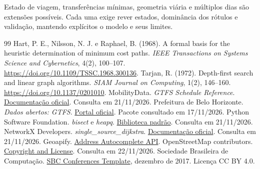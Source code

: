 \documentclass[12pt]{article}
\begin{document}
Estado de viagem, transferências mínimas, geometria viária e múltiplos dias são extensões possíveis. Cada uma exige rever estados, dominância dos rótulos e validação, mantendo explícitos o modelo e seus limites.

\small
\begin{thebibliography}{99}
\setlength{\itemsep}{0pt}
 Hart, P. E., Nilsson, N. J. e Raphael, B. (1968). A formal basis for the heuristic determination of minimum cost paths. \emph{IEEE Transactions on Systems Science and Cybernetics}, 4(2), 100--107. \url{https://doi.org/10.1109/TSSC.1968.300136}.
 Tarjan, R. (1972). Depth-first search and linear graph algorithms. \emph{SIAM Journal on Computing}, 1(2), 146--160. \url{https://doi.org/10.1137/0201010}.
 MobilityData. \emph{GTFS Schedule Reference}. \href{https://gtfs.org/documentation/schedule/reference/}{Documentação oficial}. Consulta em 21/11/2026.
 Prefeitura de Belo Horizonte. \emph{Dados abertos: GTFS}. \href{https://ckan.pbh.gov.br/dataset/gtfs}{Portal oficial}. Pacote consultado em 17/11/2026.
 Python Software Foundation. \emph{bisect} e \emph{heapq}. \href{https://docs.python.org/3/library/}{Biblioteca padrão}. Consulta em 21/11/2026.
 NetworkX Developers. \emph{single\_source\_dijkstra}. \href{https://networkx.org/documentation/stable/reference/algorithms/generated/networkx.algorithms.shortest_paths.weighted.single_source_dijkstra.html}{Documentação oficial}. Consulta em 21/11/2026.
 Geoapify. \href{https://apidocs.geoapify.com/docs/geocoding/address-autocomplete/}{Address Autocomplete API}. OpenStreetMap contributors. \href{https://www.openstreetmap.org/copyright}{Copyright and License}. Consulta em 22/11/2026.
 Sociedade Brasileira de Computação. \href{https://www.overleaf.com/latex/templates/sbc-conferences-template/blbxwjwzdngr}{SBC Conferences Template}, dezembro de 2017. Licença CC BY 4.0.
\end{thebibliography}
\end{document}
